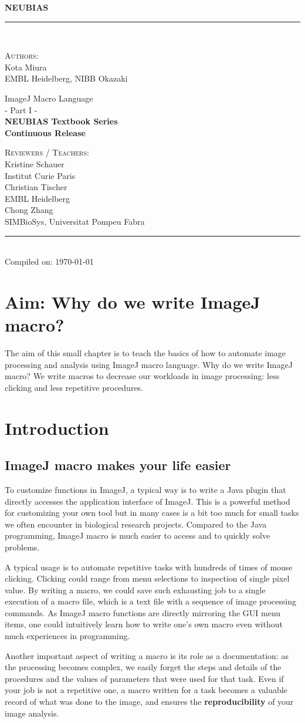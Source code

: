 \documentclass[11pt,a4paper,oneside]{report}
\newcommand{\HRule}{\rule{\linewidth}{0.5mm}}
\newcommand*{\titleTH}{\begingroup
\raggedleft
\textsc{\textbf{\Large{NEUBIAS}}}
\HRule\\
\vspace*{\baselineskip}

\hfill \textsc{\large Authors:}\\
[0.3\baselineskip]
\hfill {\Large Kota Miura}\\
{\small EMBL Heidelberg, NIBB Okazaki}\\
\vfill

{\textcolor{Medium}{\Large ImageJ Macro Language}}\\
[\baselineskip]
{\Large - Part I -}\\
[2\baselineskip]

{\bfseries NEUBIAS Textbook Series}\\
\textbf{Continuous Release}

\vfill

\hfill \textsc{Reviewers / Teachers:}\\
[0.3\baselineskip]
\hfill {\large Kristine Schauer}\\
\hfill {\small Institut Curie Paris}\\
[0.3\baselineskip]
\hfill {\large Christian Tischer}\\
\hfill {\small EMBL Heidelberg}\\
[0.3\baselineskip]
\hfill {\large Chong Zhang}\\
\hfill {\small SIMBioSys, Universitat Pompeu Fabra}\\
\HRule\\

{\small \hfill\textcolor{Medium}{ Compiled on: \today }}
\endgroup}
\begin{document}
\date{\today}

\pagestyle{empty}
\titleTH
\clearpage
\pagestyle{fancyplain}

\begingroup
\hypersetup{linkcolor=blue}
\tableofcontents
\endgroup

\clearpage

\setcounter{chapter}{2}


\section{Aim: Why do we write ImageJ macro?}
  
The aim of this small chapter is to teach the basics of how to automate image processing and analysis using ImageJ macro language. Why do we write ImageJ macro? We write macros to decrease our workloads in image processing: less clicking and less repetitive procedures. 
   
\section{Introduction}
  

\subsection{ImageJ macro makes your life easier}

To customize functions in ImageJ, a typical way is to write a Java plugin that directly accesses the application interface of ImageJ. 
This is a powerful method for customizing your own tool but in many cases is a bit too much for small tasks we often encounter in biological research projects. Compared to the Java programming, ImageJ macro is much easier to access and to quickly solve problems.

A typical usage is to automate repetitive tasks with hundreds of times of mouse clicking. Clicking could range from menu selections to inspection of single pixel value. By writing a macro, we could save such exhausting job to a single execution of a macro file, which is a text file with a sequence of image processing commands. As ImageJ macro functions are directly mirroring the GUI menu items, one could intuitively learn how to write one's own macro even without much experiences in programming.

Another important aspect of writing a macro is its role as a documentation: as the processing becomes complex, we easily forget the steps and details of the procedures and the values of parameters that were used for that task. Even if your job is not a repetitive one, a macro written for a task becomes a valuable record of what was done to the image, and ensures the \textbf{reproducibility} of your image analysis.  
\end{document}
